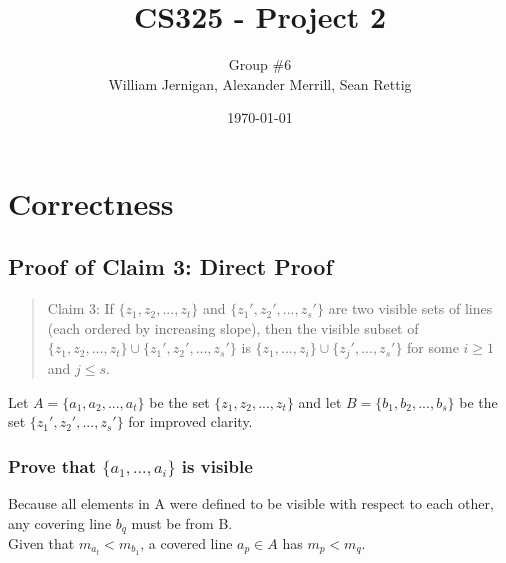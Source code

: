\documentclass{article}
\title{CS325 - Project 2}
\author{Group \#6 \\ William Jernigan, Alexander Merrill, Sean Rettig}
\date{\today}
\begin{document}
\maketitle

\section*{Correctness}
\subsection*{Proof of Claim 3: Direct Proof}

\begin{quote}
Claim 3: If $\{z_{1},z_{2},...,z_{t}\}$ and $\{z_{1}',z_{2}',...,z_{s}'\}$ are two visible sets of lines (each ordered by increasing slope), then the visible subset of $\{z_{1},z_{2},...,z_{t}\}\cup\{z_{1}',z_{2}',...,z_{s}'\}$ is $\{z_{1},...,z_{i}\}\cup\{z_{j}',...,z_{s}'\}$ for some $i \geq 1$ and $j \leq s$.
\end{quote}
Let $A = \{a_{1},a_{2},...,a_{t}\}$ be the set $\{z_{1},z_{2},...,z_{t}\}$ and let $B = \{b_{1},b_{2},...,b_{s}\}$ be the set $\{z_{1}',z_{2}',...,z_{s}'\}$ for improved clarity.

\subsubsection*{Prove that $\{a_{1},...,a_{i}\}$ is visible}
    Because all elements in A were defined to be visible with respect to each other, any covering line $b_{q}$ must be from B.\\
    Given that $m_{a_{t}} < m_{b_{1}}$, a covered line $a_{p} \in A$ has $m_{p} < m_{q}$.
    
\end{document}
